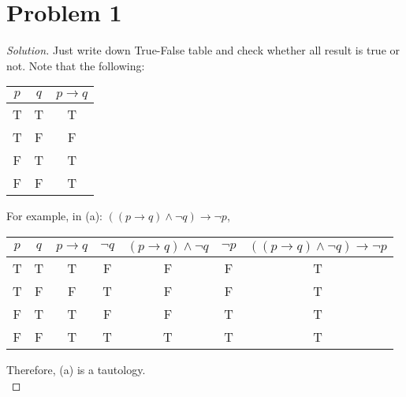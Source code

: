 \section*{Problem 1}
	\begin{proof} [Solution]
		Just write down True-False table and check whether all result is true or not.
		Note that the following:
		\begin{center}
			\setlength{\tabcolsep}{20pt}
			\renewcommand{\arraystretch}{1.4}
			\begin{tabular}{c|c|c}
				$p$ & $q$ & $p \rightarrow q$ \\ \hline
				T   & T   & T                 \\
				T   & F   & F                 \\
				F   & T   & T                 \\
				F   & F   & T                 \\
			\end{tabular}
		\end{center}
		For example, in (a): $\left(\left(p \rightarrow q\right)\wedge\neg q\right) \rightarrow \neg p$,
		\begin{center}
			\setlength{\tabcolsep}{20pt}
			\renewcommand{\arraystretch}{1.4}
			\begin{tabular}{c|c|c|c|c|c|c}
				$p$ & $q$ & $p \rightarrow q$ & $\neg q$ & $\left(p \rightarrow q\right)\wedge\neg q$ & $\neg p$ & $\left(\left(p \rightarrow q\right)\wedge\neg q\right) \rightarrow \neg p$ \\ \hline
				T & T & T                 & F     & F    & F     & T   \\
				T & F & F                 & T     & F    & F     & T   \\
				F & T & T                 & F     & F    & T     & T   \\
				F & F & T                 & T     & T    & T     & T   \\
			\end{tabular}
		\end{center}
		Therefore, (a) is a tautology.\\
	\end{proof}
	